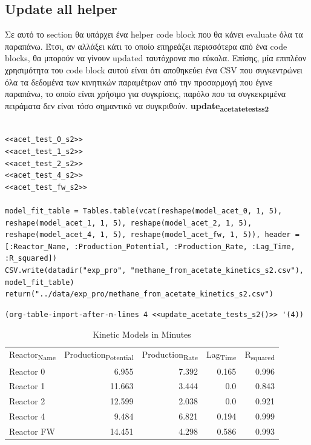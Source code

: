 \documentclass[11pt]{article}
\begin{document}
\subsection{Update all helper}
\label{sec:orgec29b64}
Σε αυτό το section θα υπάρχει ένα helper code block που θα κάνει evaluate όλα τα παραπάνω. Έτσι, αν αλλάξει κάτι το οποίο επηρεάζει περισσότερα από ένα code blocks, θα μπορούν να γίνουν updated ταυτόχρονα πιο εύκολα. Επίσης, μία επιπλέον χρησιμότητα του code block αυτού είναι ότι αποθηκεύει ένα CSV που συγκεντρώνει όλα τα δεδομένα των κινητικών παραμέτρων από την προσαρμογή που έγινε παραπάνω, το οποίο είναι χρήσιμο για συγκρίσεις, παρόλο που τα συγκεκριμένα πειράματα δεν είναι τόσο σημαντικό να συγκριθούν.
\textbf{update\textsubscript{acetate}\textsubscript{tests}\textsubscript{s2}}
\begin{verbatim}

<<acet_test_0_s2>>
<<acet_test_1_s2>>
<<acet_test_2_s2>>
<<acet_test_4_s2>>
<<acet_test_fw_s2>>

model_fit_table = Tables.table(vcat(reshape(model_acet_0, 1, 5), reshape(model_acet_1, 1, 5), reshape(model_acet_2, 1, 5), reshape(model_acet_4, 1, 5), reshape(model_acet_fw, 1, 5)), header = [:Reactor_Name, :Production_Potential, :Production_Rate, :Lag_Time, :R_squared])
CSV.write(datadir("exp_pro", "methane_from_acetate_kinetics_s2.csv"), model_fit_table)
return("../data/exp_pro/methane_from_acetate_kinetics_s2.csv")
\end{verbatim}

\begin{verbatim}
(org-table-import-after-n-lines 4 <<update_acetate_tests_s2()>> '(4))
\end{verbatim}

\begin{table}[htbp]
\caption{Kinetic Models in Minutes}
\centering
\begin{tabular}{lrrrr}
Reactor\textsubscript{Name} & Production\textsubscript{Potential} & Production\textsubscript{Rate} & Lag\textsubscript{Time} & R\textsubscript{squared}\\[0pt]
Reactor 0 & 6.955 & 7.392 & 0.165 & 0.996\\[0pt]
Reactor 1 & 11.663 & 3.444 & 0.0 & 0.843\\[0pt]
Reactor 2 & 12.599 & 2.038 & 0.0 & 0.921\\[0pt]
Reactor 4 & 9.484 & 6.821 & 0.194 & 0.999\\[0pt]
Reactor FW & 14.451 & 4.298 & 0.586 & 0.993\\[0pt]
\end{tabular}
\end{table}
\end{document}
